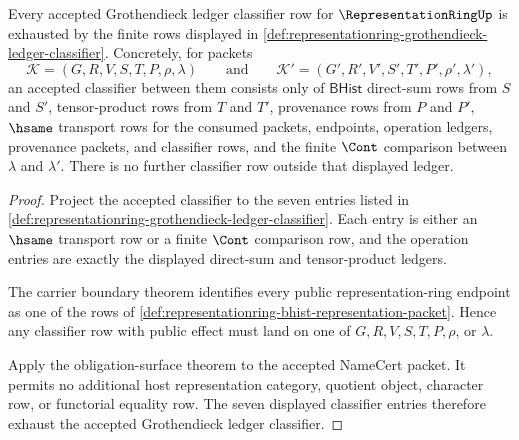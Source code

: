 \begin{theorem}
\label{thm:representationring-classifier-ledger-exhaustion}
Every accepted Grothendieck ledger classifier row for
$\RepresentationRingUp$ is exhausted by the finite rows displayed in
\autoref{def:representationring-grothendieck-ledger-classifier}. Concretely,
for packets
$$
\mathcal{K}=(G,R,V,S,T,P,\rho,\lambda)
\qquad\text{and}\qquad
\mathcal{K}'=(G',R',V',S',T',P',\rho',\lambda'),
$$
an accepted classifier between them consists only of $\mathsf{BHist}$
direct-sum rows from $S$ and $S'$, tensor-product rows from $T$ and $T'$,
provenance rows from $P$ and $P'$, $\hsame$ transport rows for the consumed
packets, endpoints, operation ledgers, provenance packets, and classifier
rows, and the finite $\Cont$ comparison between $\lambda$ and $\lambda'$.
There is no further classifier row outside that displayed ledger.
\end{theorem}
\begin{proof}
Project the accepted classifier to the seven entries listed in
\autoref{def:representationring-grothendieck-ledger-classifier}. Each entry is
either an $\hsame$ transport row or a finite $\Cont$ comparison row, and the
operation entries are exactly the displayed direct-sum and tensor-product
ledgers.

The carrier boundary theorem identifies every public representation-ring
endpoint as one of the rows of
\autoref{def:representationring-bhist-representation-packet}. Hence any
classifier row with public effect must land on one of $G,R,V,S,T,P,\rho$, or
$\lambda$.

Apply the obligation-surface theorem to the accepted NameCert packet. It
permits no additional host representation category, quotient object, character
row, or functorial equality row. The seven displayed classifier entries
therefore exhaust the accepted Grothendieck ledger classifier.
\end{proof}

